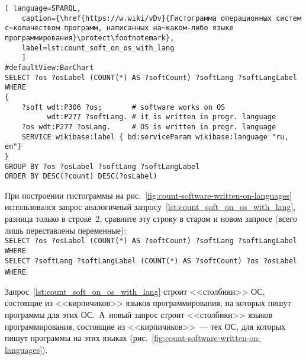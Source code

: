 % 
\begin{lstlisting}[ language=SPARQL, 
	caption={\href{https://w.wiki/vDv}{Гистограмма операционных систем с~количеством программ, написанных на~каком-либо языке программирования}\protect\footnotemark},
	label=lst:count_soft_on_os_with_lang
	]
#defaultView:BarChart
SELECT ?os ?osLabel (COUNT(*) AS ?softCount) ?softLang ?softLangLabel WHERE
{
    ?soft wdt:P306 ?os;       # software works on OS
          wdt:P277 ?softLang. # it is written in progr. language
    ?os wdt:P277 ?osLang.     # OS is written in progr. language
    SERVICE wikibase:label { bd:serviceParam wikibase:language "ru, en"}
}
GROUP BY ?os ?osLabel ?softLang ?softLangLabel
ORDER BY DESC(?count) DESC(?osLabel)
\end{lstlisting}



\newpage
При построении гистограммы на рис.~\ref{fig:count-software-written-on-languages} 
использовался запрос аналогичный запросу~\ref{lst:count_soft_on_os_with_lang}, 
разница только в строке~2, сравните эту строку в старом и новом запросе 
(всего лишь переставлены переменные):\\ 
\lstinline|SELECT ?os ?osLabel (COUNT(*) AS ?softCount) ?softLang ?softLangLabel WHERE|\\
\lstinline|SELECT ?softLang ?softLangLabel (COUNT(*) AS ?softCount) ?os ?osLabel WHERE|. 

Запрос~\ref{lst:count_soft_on_os_with_lang} строит <<столбики>> ОС, 
    состоящие из <<кирпичиков>> языков программирования, на которых пишут программы для этих ОС.\, 
А~новый запрос 
    строит <<столбики>> языков программирования, 
    состоящие из <<кирпичиков>>~--- тех ОС, 
                                    для которых пишут программы на этих языках 
                                    (рис.~\ref{fig:count-software-written-on-languages}). 

